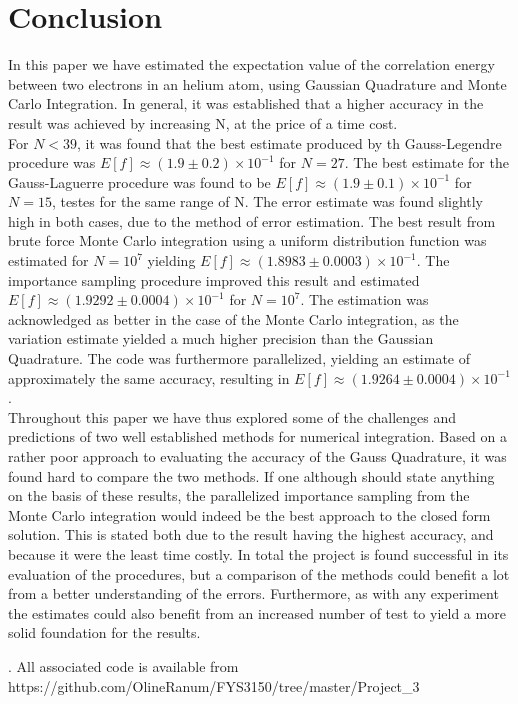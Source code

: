 \documentclass[%
reprint,nofootinbib,
amsmath,amssymb,
aps,
]{revtex4-1}
\begin{document}
\section{Conclusion} \noindent 
In this paper we have estimated the expectation value of the correlation energy between two electrons in an helium atom, using Gaussian Quadrature and Monte Carlo Integration. In general, it was established that a higher accuracy in the result was achieved by increasing N, at the price of a time cost. \\ \indent For $N<39$, it was found that the best estimate produced by th Gauss-Legendre procedure was $E[f] \approx (1.9 \pm 0.2)\times 10^{-1}$ for $N=27$. The best estimate for the Gauss-Laguerre procedure was found to be $E[f]\approx (1.9 \pm 0.1)\times 10^{-1}$ for $N=15$, testes for the same range of N. The error estimate was found slightly high in both cases, due to the method of error estimation. The best result from brute force Monte Carlo integration using a uniform distribution function was estimated for $N=10^7$ yielding $E[f]\approx (1.8983 \pm 0.0003)\times 10^{-1}$. The importance sampling procedure improved this result and estimated $E[f]\approx (1.9292 \pm 0.0004)\times 10^{-1}$ for $N=10^7$. The estimation was acknowledged as better in the case of the Monte Carlo integration, as the variation estimate yielded a much higher precision than the Gaussian Quadrature. The code was furthermore parallelized, yielding an estimate of approximately the same accuracy, resulting in $E[f]\approx (1.9264 \pm 0.0004)\times 10^{-1}$.\\ \indent 
Throughout this paper we have thus explored some of the challenges and predictions of two well established methods for numerical integration. Based on a rather poor approach to evaluating the accuracy of the Gauss Quadrature, it was found hard to compare the two methods. If one although should state anything on the basis of these results, the parallelized importance sampling from the Monte Carlo integration would indeed be the best approach to the closed form solution. This is stated both due to the result having the highest accuracy, and because it were the least time costly. In total the project is found successful in its evaluation of the procedures, but a comparison of the methods could benefit a lot from a better understanding of the errors. Furthermore, as with any experiment the estimates could also benefit from an increased number of test to yield a more solid foundation for the results. 

\newpage. \newpage
\onecolumngrid \noindent 
All associated code is available from\\
https://github.com/OlineRanum/FYS3150/tree/master/Project\_3
\vspace{5cm}
\end{document}

